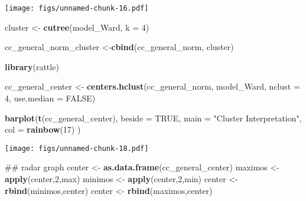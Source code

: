 \documentclass[11pt,]{article}
\newenvironment{Shaded}{\begin{snugshade}}{\end{snugshade}}
\newcommand{\KeywordTok}[1]{\textcolor[rgb]{0.13,0.29,0.53}{\textbf{#1}}}
\newcommand{\DataTypeTok}[1]{\textcolor[rgb]{0.13,0.29,0.53}{#1}}
\newcommand{\DecValTok}[1]{\textcolor[rgb]{0.00,0.00,0.81}{#1}}
\newcommand{\StringTok}[1]{\textcolor[rgb]{0.31,0.60,0.02}{#1}}
\newcommand{\OtherTok}[1]{\textcolor[rgb]{0.56,0.35,0.01}{#1}}
\newcommand{\NormalTok}[1]{#1}
\begin{document}
\texttt{[image: figs/unnamed-chunk-16.pdf]}

\begin{Shaded}
\begin{Highlighting}[]
\NormalTok{cluster <-}\StringTok{ }\KeywordTok{cutree}\NormalTok{(model_Ward, }\DataTypeTok{k =} \DecValTok{4}\NormalTok{)}

\NormalTok{cc_general_norm_cluster <-}\KeywordTok{cbind}\NormalTok{(cc_general_norm, cluster)}

\KeywordTok{library}\NormalTok{(rattle)}

\NormalTok{cc_general_center <-}\StringTok{ }\KeywordTok{centers.hclust}\NormalTok{(cc_general_norm,}
\NormalTok{                                    model_Ward,}
                                    \DataTypeTok{nclust =} \DecValTok{4}\NormalTok{,}
                                    \DataTypeTok{use.median =} \OtherTok{FALSE}\NormalTok{)}
\end{Highlighting}
\end{Shaded}

\begin{Shaded}
\begin{Highlighting}[]
\KeywordTok{barplot}\NormalTok{(}\KeywordTok{t}\NormalTok{(cc_general_center),}
        \DataTypeTok{beside =} \OtherTok{TRUE}\NormalTok{,}
        \DataTypeTok{main =} \StringTok{"Cluster Interpretation"}\NormalTok{,}
        \DataTypeTok{col =} \KeywordTok{rainbow}\NormalTok{(}\DecValTok{17}\NormalTok{)}
\NormalTok{        )}
\end{Highlighting}
\end{Shaded}

\texttt{[image: figs/unnamed-chunk-18.pdf]}

\begin{Shaded}
\begin{Highlighting}[]
\NormalTok{## radar graph}
\NormalTok{center  <-}\StringTok{ }\KeywordTok{as.data.frame}\NormalTok{(cc_general_center)}
\NormalTok{maximos <-}\StringTok{ }\KeywordTok{apply}\NormalTok{(center,}\DecValTok{2}\NormalTok{,max)}
\NormalTok{minimos <-}\StringTok{ }\KeywordTok{apply}\NormalTok{(center,}\DecValTok{2}\NormalTok{,min)}
\NormalTok{center  <-}\StringTok{ }\KeywordTok{rbind}\NormalTok{(minimos,center)}
\NormalTok{center  <-}\StringTok{ }\KeywordTok{rbind}\NormalTok{(maximos,center)}
\end{Highlighting}
\end{Shaded}
\end{document}
